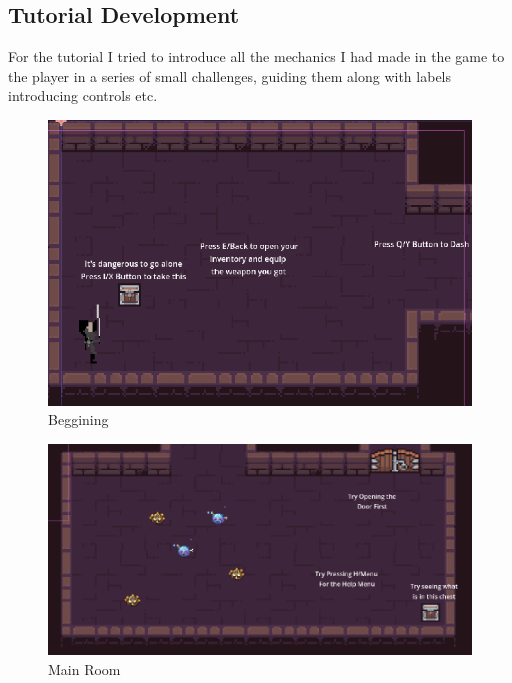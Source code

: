 \documentclass{article}
\begin{document}
        \subsection{Tutorial Development}
        For the tutorial I tried to introduce all the mechanics I had made in the game to the player in a series of small challenges, guiding them along with labels introducing controls etc.\\
        \begin{multicols}{2}
                \begin{figure}[H]
                        \centering
                        \includegraphics[width = 0.8\columnwidth]{images/development/Tutorial_1.PNG}
                        \caption{Beggining}
                \end{figure}
                \begin{figure}[H]
                        \centering
                        \includegraphics[width = 0.9\columnwidth]{images/development/Tutorial_3.PNG}
                        \caption{Main Room}
                \end{figure}
                \begin{figure}[H]
                        \centering

\end{figure}
\end{multicols}
\end{document}
